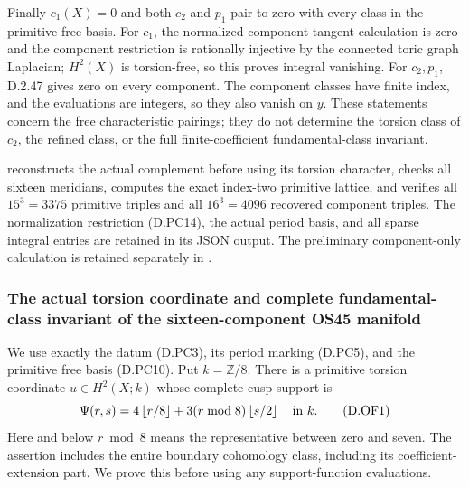 Finally $c_1(X)=0$ and both $c_2$ and $p_1$ pair to zero with
every class in the primitive free basis. For $c_1$, the normalized
component tangent calculation is zero and the component restriction
is rationally injective by the connected toric graph Laplacian;
$H^2(X)$ is torsion-free, so this proves integral vanishing.
For $c_2,p_1$, D.2.47 gives zero on every component. The component
classes have finite index, and the evaluations are integers, so they
also vanish on $y$. These statements concern the free characteristic
pairings; they do not determine the torsion class of $c_2$, the
refined class, or the full finite-coefficient fundamental-class
invariant.

reconstructs the actual complement before using its torsion
character, checks all sixteen meridians, computes the exact
index-two primitive lattice, and verifies all $15^3=3375$ primitive
triples and all $16^3=4096$ recovered component triples. The
normalization restriction (D.PC14), the actual period basis, and
all sparse integral entries are retained in its JSON output.
The preliminary component-only calculation is retained separately
in .

\subsubsection*{The actual torsion coordinate and complete fundamental-class
invariant of the sixteen-component OS45 manifold}
We use exactly the datum (D.PC3), its period marking (D.PC5), and the
primitive free basis (D.PC10). Put \(k=\mathbb Z/8\).
There is a primitive torsion coordinate
\(u\in H^2(X;k)\) whose complete cusp support is
\[
 \Psi(r,s)=4\left\lfloor r/8\right\rfloor
       +3(r\bmod8)\left\lfloor s/2\right\rfloor
                                      \quad\hbox{in }k.       \tag{D.OF1}
\]
Here and below \(r\bmod8\) means the representative between zero and
seven. The assertion includes the entire boundary cohomology class,
including its coefficient-extension part. We prove this before using
any support-function evaluations.

